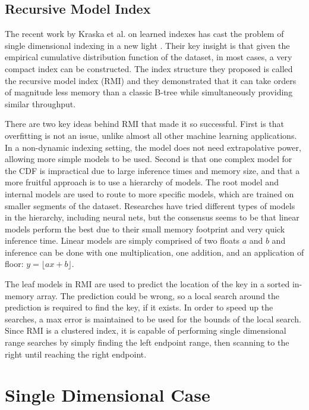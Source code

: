 \documentclass[sigconf,10pt]{acmart}
\begin{document}
\subsection{Recursive Model Index}

The recent work by Kraska et al. on learned indexes
has cast the problem of single dimensional indexing in a new light \cite{Learned_Index}.
Their key insight is that given the empirical cumulative distribution function
of the dataset, in most cases, a very compact index can be constructed. 
The index structure they proposed is called the recursive model index (RMI) and they
demonstrated that it can take orders of magnitude less memory
than a classic B-tree while simultaneously providing similar throughput.

There are two key ideas behind RMI that made it so successful.
First is that overfitting is not an issue, unlike almost all other machine learning 
applications. In a non-dynamic indexing setting, the model does not need extrapolative
power, allowing more simple models to be used.
Second is that one complex model for the CDF is impractical due to large inference times
and memory size, and that a more fruitful approach is to 
use a hierarchy of models. The root model and internal models are used to route
to more specific models, which are trained on smaller segments of the dataset. 
Researches have tried different types of models in the hierarchy, including neural nets,
but the consensus seems to be that linear models perform the best due
to their small memory footprint and very quick inference time. %
Linear models are simply comprised of two floats $a$ and $b$ and inference
can be done with one multiplication, one addition, and an application of floor:
$y = \lfloor ax + b \rfloor$.

The leaf models in RMI are used to predict the location of the key in a sorted 
in-memory array. The prediction could be wrong, so a local search around the prediction
is required to find the key, if it exists. In order to speed up the searches,
a max error is maintained to be used for the bounds of the local search.
Since RMI is a clustered index, it is capable of performing single dimensional range searches
by simply finding the left endpoint range, then scanning to the right until reaching the right
endpoint.


\section{Single Dimensional Case}
\end{document}
